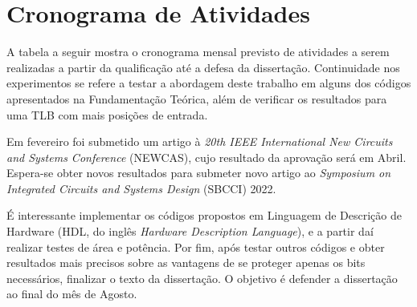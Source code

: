 \chapter{Cronograma de Atividades}
A tabela a seguir mostra o cronograma mensal previsto de atividades a serem realizadas a partir da qualificação até a defesa da dissertação. Continuidade nos experimentos se refere a testar a abordagem deste trabalho em alguns dos códigos apresentados na Fundamentação Teórica, além de verificar os resultados para uma TLB com mais posições de entrada.

Em fevereiro foi submetido um artigo à \textit{20th  IEEE International New Circuits and Systems Conference} (NEWCAS), cujo resultado da aprovação será em Abril. Espera-se obter novos resultados para submeter novo artigo ao \textit{Symposium on Integrated Circuits and Systems Design} (SBCCI) 2022.

É interessante implementar os códigos propostos em Linguagem de Descrição de Hardware (HDL, do inglês \textit{Hardware Description Language}), e a partir daí realizar testes de área e potência. Por fim, após testar outros códigos e obter resultados mais precisos sobre as vantagens de se proteger apenas os bits necessários, finalizar o texto da dissertação. O objetivo é defender a dissertação ao final do mês de Agosto.

